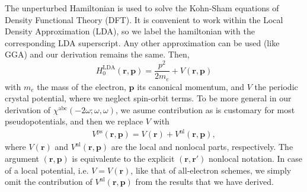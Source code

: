 \documentclass[floatfix,prb,aps,superscriptaddress,showpacs,11pt,preprint,letterpaper]{revtex4}
\begin{document}
The unperturbed Hamiltonian 
is used to solve the Kohn-Sham equations\cite{kohnPR65} of Density  
Functional Theory (DFT). It is convenient to work within the Local 
Density Approximation (LDA), so we label the hamiltonian with the corresponding  
LDA superscript. Any other approximation can be used (like GGA) and our 
derivation remains the same. Then,
\begin{equation*}
H^{\mathrm{LDA}}_{0}(\mathbf{r},\mathbf{p})
=\frac{p^{2}}{2m_e}+V(\mathbf{r},\mathbf{p})
\end{equation*}
with $m_e$ the mass of the electron, $\mathbf{p}$ its canonical momentum, and 
$V$
 the periodic crystal potential, where we neglect spin-orbit terms.
To be more general in our derivation of
$\chi^{\mathrm{a}\mathrm{b}\mathrm{c}}(-2\omega;\omega,\omega)$, we asume
contribution as is customary for most
pseudopotentials, and then we replace $V$ with
\begin{align*}
V^{\mathrm{ps}}(\mathbf{r},\mathbf{p})=V(\mathbf{r})+V^{\mathrm{nl}}(\mathbf{r},\mathbf{p})
,
\end{align*}
where 
$V(\mathbf{r})$ and 
$V^{\mathrm{nl}}(\mathbf{r},\mathbf{p})$  
are the local and nonlocal parts, 
 respectively.
The argument $(\mathbf{r},\mathbf{p})$
  is equivalente to the
explicit $(\mathbf{r},\mathbf{r}')$ nonlocal notation.\cite{ismailPRL01}
In case of
a local potential, i.e. $V= V(\mathbf{r})$, 
like that of all-electron schemes, 
we simply omit the contribution of $V^{\mathrm{nl}}(\mathbf{r},\mathbf{p})$
from the results that we have derived.
\end{document}
